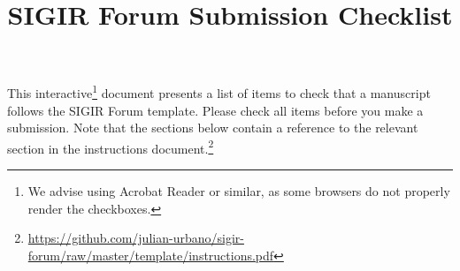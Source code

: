 \documentclass[news]{sigirforum}
\begin{document}
\title{\vspace{-0.2cm}SIGIR Forum Submission Checklist}

\maketitle 
\sloppy
\vspace{-1.6cm}
This interactive\footnote{We advise using Acrobat Reader or similar, as some browsers do not properly render the checkboxes.} document presents a list of items to check that a manuscript follows the SIGIR Forum template. Please check all items before you make a submission. Note that the sections below contain a reference to the relevant section in the instructions document.\footnote{\url{https://github.com/julian-urbano/sigir-forum/raw/master/template/instructions.pdf}}
\end{document}
